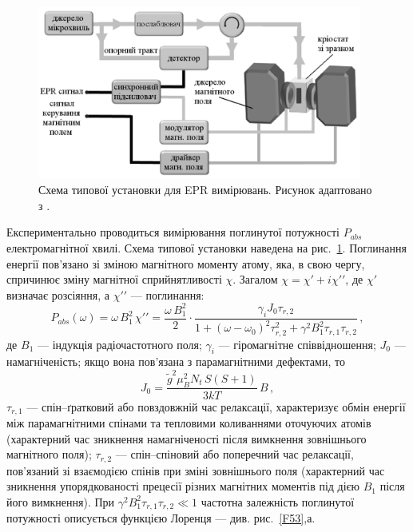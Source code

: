 \documentclass[10pt,a5paper,titlepage,oneside]{book}
\numberwithin{equation}{part}
\begin{document}
\begin{figure}[!b]
\center
\vspace{-5mm}
\includegraphics[width=0.95\textwidth]{Fig5_2}
\vspace{-3mm}
\caption{Схема типової установки для EPR вимірювань.
Рисунок адаптовано з \cite{tuomisto2019}.
}
\vspace{-3mm}
\label{F52}
\end{figure}



Експериментально проводиться вимірювання поглинутої потужності $P_{abs}$
електромагнітної хвилі.
Схема типової установки наведена на рис.~\ref{F52}.
Поглинання енергії пов'язано зі зміною магнітного моменту атому,
яка, в свою чергу, спричинює зміну магнітної сприйнятливості $\chi$.
Загалом $\chi=\chi\prime+i\chi\prime\prime$,
де $\chi\prime$ визначає розсіяння, а $\chi\prime\prime$ --- поглинання:
\begin{equation}\label{EPRP}
P_{abs}(\omega)=\omega\,B_1^2\,\chi\prime\prime=\frac{\omega\,B_1^2}{2}\cdot\frac{\gamma_{i} J_0 \tau_{r,2}}
 {1+(\omega-\omega_0)^2\tau_{r,2}^2+\gamma^2B_1^2\tau_{r,1}\tau_{r,2}}\,,
\end{equation}
де
$B_1$ --- індукція радіочастотного поля;
$\gamma_{i}$ --- гіромагнітне співвідношення;
$J_0$ --- намагніченість; якщо вона пов'язана з парамагнітними дефектами, то
\begin{equation}\label{EPRJ0}
J_0=\frac{\tilde{g}^2\mu_B^2N_t\,S(S+1)}{3kT}\,B\,,
\end{equation}
$\tau_{r,1}$ --- спін--ґратковий або повздовжній час релаксації,
характеризує обмін енергії між парамагнітними спінами та тепловими
коливаннями оточуючих атомів (характерний час зникнення намагніченості
після вимкнення зовнішнього магнітного поля);
$\tau_{r,2}$ --- спін--спіновий або поперечний час релаксації,
пов'язаний зі взаємодією спінів при зміні зовнішнього поля
(характерний час зникнення упорядкованості прецесії різних магнітних моментів
під дією $B_1$ після його вимкнення).
При $\gamma^2B_1^2\tau_{r,1}\tau_{r,2}\ll 1$ частотна залежність поглинутої
потужності описується функцією Лоренця --- див. рис.~\ref{F53},а.
\end{document}
